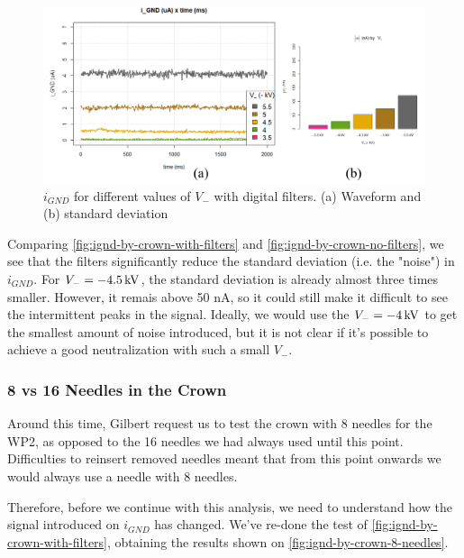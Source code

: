\documentclass[oneside,12pt]{article}
\begin{document}
\begin{figure}[h!]
    \centering
    \includegraphics[width=1\textwidth,trim=1 1 1 1,clip]{figures/ignd-by-crown-with-filters.png}
    \caption{$i_{GND}$ for different values of $V_-$ with digital filters. (a) Waveform and (b) standard deviation}
    \label{fig:ignd-by-crown-with-filters}
\end{figure}

Comparing \autoref{fig:ignd-by-crown-with-filters} and \autoref{fig:ignd-by-crown-no-filters}, we see that the filters significantly 
reduce the standard deviation (i.e. the "noise") in $i_{GND}$. For $V_- = - 4.5 \,\mathrm{kV}$, the standard deviation is already almost 
three times smaller. However, it remais above 50 nA, so it could still make it difficult to see the intermittent peaks in the signal.
Ideally, we would use the $V_- = - 4 \,\mathrm{kV}$ to get the smallest amount of noise introduced, but it is not clear if it's possible
to achieve a good neutralization with such a small $V_-$.

\subsubsection{8 vs 16 Needles in the Crown}

Around this time, Gilbert request us to test the crown with 8 needles for the WP2, as opposed to the 16 needles we had always used until 
this point. Difficulties to reinsert removed needles meant that from this point onwards we would always use a needle with 8 needles. 

Therefore, before we continue with this analysis, we need to understand how the signal introduced on $i_{GND}$ has changed. We've re-done 
the test of \autoref{fig:ignd-by-crown-with-filters}, obtaining the results shown on \autoref{fig:ignd-by-crown-8-needles}.
\end{document}
